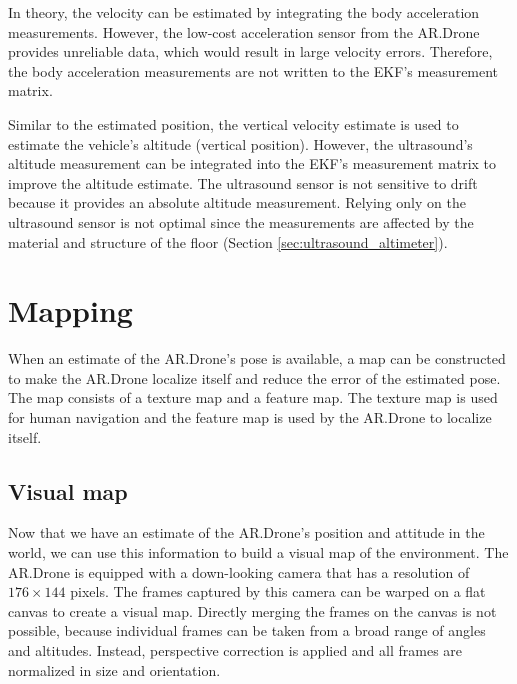 In theory, the velocity can be estimated by integrating the body acceleration measurements.
However, the low-cost acceleration sensor from the AR.Drone provides unreliable data, which would result in large velocity errors.
Therefore, the body acceleration measurements are not written to the EKF's measurement matrix.

Similar to the estimated position, the vertical velocity estimate is used to estimate the vehicle's altitude (vertical position).
However, the ultrasound's altitude measurement can be integrated into the EKF's measurement matrix to improve the altitude estimate.
The ultrasound sensor is not sensitive to drift because it provides an absolute altitude measurement.
Relying only on the ultrasound sensor is not optimal since the measurements are affected by the material and structure of the floor (Section \ref{sec:ultrasound_altimeter}).



	\section{Mapping}
	\label{sec:mapping}
When an estimate of the AR.Drone's pose is available, a map can be constructed to make the AR.Drone localize itself and reduce the error of the estimated pose.
The map consists of a texture map and a feature map.
The texture map is used for human navigation and the feature map is used by the AR.Drone to localize itself.

	\subsection{Visual map}
\label{sec:texture_map}
Now that we have an estimate of the AR.Drone's position and attitude in the world, we can use this information to build a visual map of the environment.
The AR.Drone is equipped with a down-looking camera that has a resolution of $176 \times 144$ pixels.
The frames captured by this camera can be warped on a flat canvas to create a visual map.
Directly merging the frames on the canvas is not possible, because individual frames can be taken from a broad range of angles and altitudes.
Instead, perspective correction is applied and all frames are normalized in size and orientation.

